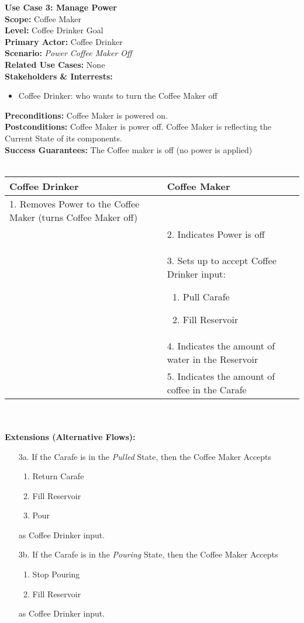 \documentclass[letterpaper]{article}
\begin{document}
\noindent
\textbf{Use Case 3: Manage Power}\\
\textbf{Scope:  }Coffee Maker\\
\textbf{Level:  }Coffee Drinker Goal\\
\textbf{Primary Actor:  }Coffee Drinker\\
\textbf{Scenario:  }\textit{Power Coffee Maker Off}\\
\textbf{Related Use Cases:  }None\\
\textbf{Stakeholders \& Interrests:  }
\begin{itemize}
\item Coffee Drinker:  who wants to turn the Coffee Maker off
\end{itemize}
\textbf{Preconditions:  }Coffee Maker is powered on.\\
\textbf{Postconditions:  }Coffee Maker is power off.  Coffee Maker is
reflecting the Current State of its components.\\
\textbf{Success Guarantees:  }The Coffee maker is off (no power is
applied)\\\\
\begin{tabular}{|p{5.75cm}|p{5.75cm}|}\hline
\textbf{Coffee Drinker} & \textbf{Coffee Maker}\\\hline
1.  Removes Power to the Coffee Maker (turns Coffee Maker off) &
    \\\hline
& 2.  Indicates Power is off\\\hline
& 3.  Sets up to accept Coffee Drinker input: 
\begin{enumerate}
\item Pull Carafe
\item Fill Reservoir
\end{enumerate}
\\\hline
& 4.  Indicates the amount of water in the Reservoir\\\hline
& 5.  Indicates the amount of coffee in the Carafe\\\hline
\end{tabular}\\\\
\textbf{Extensions (Alternative Flows):}
\begin{itemize}
\item[3a.]If the Carafe is in the \textit{Pulled} State, then the
Coffee Maker Accepts
\begin{enumerate}
\item Return Carafe
\item Fill Reservoir
\item Pour
\end{enumerate}
as Coffee Drinker input.
\item[3b.]If the Carafe is in the \textit{Pouring} State, then the
Coffee Maker Accepts
\begin{enumerate}
\item Stop Pouring
\item Fill Reservoir
\end{enumerate}
as Coffee Drinker input.
\end{itemize}
\end{document}
